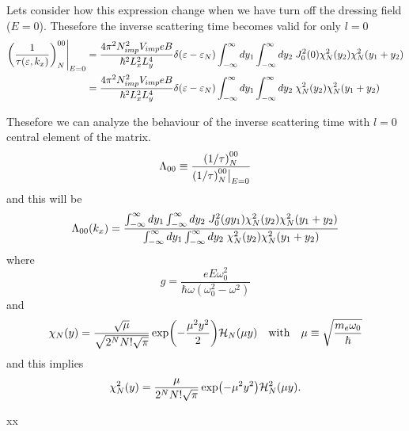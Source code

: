 \noindent
Lets consider how this expression change when we have turn off the dressing field ($E = 0$). Thesefore the inverse scattering time becomes valid for only $l=0$
\begin{equation} \label{5.6}
  \begin{aligned}
    \qty(\frac{1}{\tau(\varepsilon,k_x)})^{00}_{N}\Bigg|_{E=0} & =
    \frac { 4\pi^2 N_{imp}^2 V_{imp} eB}{\hbar^2 L_x^2 L_y^4}
    \delta(\varepsilon - \varepsilon_{N})
    \int_{-\infty}^{\infty} dy_1
    \int_{-\infty}^{\infty} dy_2 \;
    J_0^2\qty(0)
    {\chi}^2_{N}\qty(y_2)
    {\chi}^2_{N}\qty(y_1 + y_2) \\
    & =
    \frac { 4\pi^2 N_{imp}^2 V_{imp} eB}{\hbar^2 L_x^2 L_y^4}
    \delta(\varepsilon - \varepsilon_{N})
    \int_{-\infty}^{\infty} dy_1
    \int_{-\infty}^{\infty} dy_2 \;
    {\chi}^2_{N}\qty(y_2)
    {\chi}^2_{N}\qty(y_1 + y_2)
  \end{aligned}
\end{equation}


\noindent
Thesefore we can analyze the behaviour of the inverse scattering time with
$l=0$ central element of the matrix.
\begin{equation} \label{5.7}
    \Lambda_{00} \equiv
    \frac{\qty(1/\tau)^{00}_{N}}{\qty(1/\tau)^{00}_{N}\big|_{E=0}}
\end{equation}
and this will be
\begin{equation} \label{5.8}
    \Lambda_{00}(k_x) =
    \frac
    {\int_{-\infty}^{\infty} dy_1
    \int_{-\infty}^{\infty} dy_2 \;
    J_0^2\qty({gy_1})
    {\chi}^2_{N}\qty(y_2)
    {\chi}^2_{N}\qty(y_1 + y_2)}
    {\int_{-\infty}^{\infty} dy_1
    \int_{-\infty}^{\infty} dy_2 \;
    {\chi}^2_{N}\qty(y_2)
    {\chi}^2_{N}\qty(y_1 + y_2)}
\end{equation}
where
\begin{equation} \label{5.9}
    g = \frac{eE\omega_0^2}{\hbar\omega(\omega_0^2 - \omega^2)}
\end{equation}
and
\begin{equation} \label{5.10}
  \chi_N(y) = \frac{\sqrt{\mu}}{\sqrt{2^{N}N!\sqrt{\pi}}}
  \exp(-\frac{\mu^2 y^2}{2})
  \mathcal{H}_N\qty(\mu y) \quad \text{with} \quad
  \mu \equiv \sqrt{\frac{m_e \omega_0}{\hbar}}
\end{equation}
and this implies
\begin{equation} \label{5.11}
  \chi^2_N(y) = \frac{{\mu}}{{2^{N}N!\sqrt{\pi}}}
  \exp(-{\mu^2 y^2})
  \mathcal{H}^2_N\qty(\mu y).
\end{equation}






























xx
